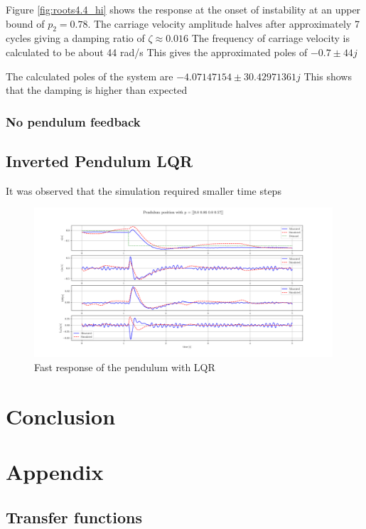 \documentclass{article}
\begin{document}
Figure \ref{fig:roots4.4_hi} shows the response at the onset of instability at an upper bound of $p_2 = 0.78$.
The carriage velocity amplitude halves after approximately 7 cycles giving a damping ratio of $\zeta \approx 0.016$
The frequency of carriage velocity is calculated to be about 44 rad/s
This gives the approximated poles of $-0.7 \pm 44j$

The calculated poles of the system are $-4.07147154 \pm 30.42971361j$
This shows that the damping is higher than expected 

\subsubsection{No pendulum feedback}


\subsection{Inverted Pendulum LQR}

It was observed that the simulation required smaller time steps

\begin{figure}
  \centering
  \includegraphics[width=0.99\textwidth]{figures/lqr_pendulum_fast.png}
  \caption{Fast response of the pendulum with LQR}
  \label{fig:lqr_fast}
\end{figure}



\section{Conclusion}


\newpage
\section{Appendix}

\subsection{Transfer functions}
\end{document}
